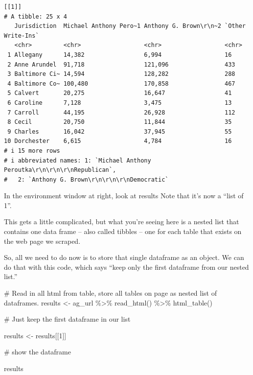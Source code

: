 \documentclass[
  letterpaper,
  DIV=11,
  numbers=noendperiod]{scrreprt}
\newenvironment{Shaded}{\begin{snugshade}}{\end{snugshade}}
\newcommand{\CommentTok}[1]{\textcolor[rgb]{0.37,0.37,0.37}{#1}}
\newcommand{\DecValTok}[1]{\textcolor[rgb]{0.68,0.00,0.00}{#1}}
\newcommand{\FunctionTok}[1]{\textcolor[rgb]{0.28,0.35,0.67}{#1}}
\newcommand{\NormalTok}[1]{\textcolor[rgb]{0.00,0.23,0.31}{#1}}
\newcommand{\OtherTok}[1]{\textcolor[rgb]{0.00,0.23,0.31}{#1}}
\newcommand{\SpecialCharTok}[1]{\textcolor[rgb]{0.37,0.37,0.37}{#1}}
\begin{document}
\begin{verbatim}
[[1]]
# A tibble: 25 x 4
   Jurisdiction  Michael Anthony Pero~1 Anthony G. Brown\r\n~2 `Other Write-Ins`
   <chr>         <chr>                  <chr>                  <chr>            
 1 Allegany      14,382                 6,994                  16               
 2 Anne Arundel  91,718                 121,096                433              
 3 Baltimore Ci~ 14,594                 128,282                288              
 4 Baltimore Co~ 100,480                170,858                467              
 5 Calvert       20,275                 16,647                 41               
 6 Caroline      7,128                  3,475                  13               
 7 Carroll       44,195                 26,928                 112              
 8 Cecil         20,750                 11,844                 35               
 9 Charles       16,042                 37,945                 55               
10 Dorchester    6,615                  4,784                  16               
# i 15 more rows
# i abbreviated names: 1: `Michael Anthony Peroutka\r\n\r\n\r\nRepublican`,
#   2: `Anthony G. Brown\r\n\r\n\r\nDemocratic`
\end{verbatim}

In the environment window at right, look at results Note that it's now a
``list of 1''.

This gets a little complicated, but what you're seeing here is a nested
list that contains one data frame -- also called tibbles -- one for each
table that exists on the web page we scraped.

So, all we need to do now is to store that single dataframe as an
object. We can do that with this code, which says ``keep only the first
dataframe from our nested list.''

\begin{Shaded}
\begin{Highlighting}[]
\CommentTok{\# Read in all html from table, store all tables on page as nested list of dataframes.}
\NormalTok{results }\OtherTok{\textless{}{-}}\NormalTok{ ag\_url }\SpecialCharTok{\%\textgreater{}\%}
  \FunctionTok{read\_html}\NormalTok{() }\SpecialCharTok{\%\textgreater{}\%}
  \FunctionTok{html\_table}\NormalTok{()}

\CommentTok{\# Just keep the first dataframe in our list}

\NormalTok{results }\OtherTok{\textless{}{-}}\NormalTok{ results[[}\DecValTok{1}\NormalTok{]]}

\CommentTok{\# show the dataframe}

\NormalTok{results}
\end{Highlighting}
\end{Shaded}
\end{document}
